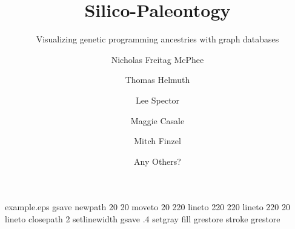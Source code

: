%
%
%
%
%
\begin{filecontents*}{example.eps}
gsave
newpath
  20 20 moveto
  20 220 lineto
  220 220 lineto
  220 20 lineto
closepath
2 setlinewidth
gsave
  .4 setgray fill
grestore
stroke
grestore
\end{filecontents*}
%
\RequirePackage{fix-cm}
%
\documentclass[smallextended]{svjour3}       %
%
\smartqed  %
%
\usepackage{graphicx}
\usepackage{todonotes}
%
%
%
%
%


\title{Silico-Paleontogy%
}
\subtitle{Visualizing genetic programming ancestries with graph databases}


\author{Nicholas Freitag McPhee         \and
        Thomas Helmuth \and
        Lee Spector \and
        Maggie Casale \and
        Mitch Finzel \and
        Any Others? %
}


